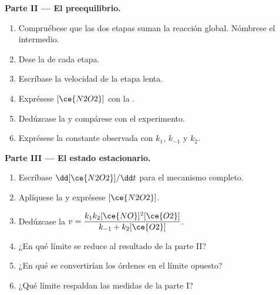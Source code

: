 \begin{problem}
\medskip
\noindent\textbf{Parte II --- El preequilibrio.}
\begin{enumerate}[resume]
  \item Compruébese que las dos etapas suman la reacción global.
        Nómbrese el intermedio.
  \item Dese la  de cada etapa.
  \item Escríbase la velocidad de la etapa lenta.
  \item Exprésese $[\ce{N2O2}]$ con la .
  \item Dedúzcase la  y compárese con el experimento.
  \item Exprésese la constante observada con $k_1$, $k_{-1}$ y $k_2$.
\end{enumerate}

\medskip
\noindent\textbf{Parte III --- El estado estacionario.}
\begin{enumerate}[resume]
  \item Escríbase $\dd[\ce{N2O2}]/\dd t$ para el mecanismo completo.
  \item Aplíquese la  y exprésese
        $[\ce{N2O2}]$.
  \item Dedúzcase la  $v = \dfrac{k_1k_2[\ce{NO}]^2[\ce{O2}]}{k_{-1} +
        k_2[\ce{O2}]}$.
  \item ¿En qué límite se reduce al resultado de la parte II?
  \item ¿En qué se convertirían los órdenes en el límite opuesto?
  \item ¿Qué límite respaldan las medidas de la parte I?
\end{enumerate}


\end{problem}
